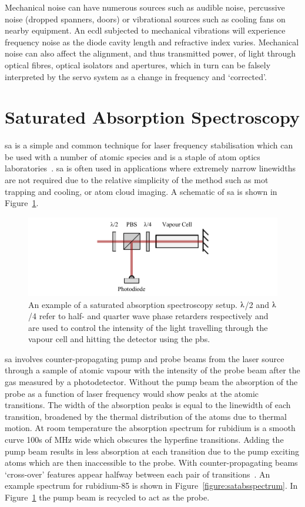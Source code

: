 Mechanical noise can have numerous sources such as audible noise, percussive noise (dropped spanners, doors) or vibrational sources such as cooling fans on nearby equipment.
An \gls{ecdl} subjected to mechanical vibrations will experience frequency noise as the diode cavity length and refractive index varies.
Mechanical noise can also affect the alignment, and thus transmitted power, of light through optical fibres, optical isolators and apertures, which in turn can be falsely interpreted by the servo system as a change in frequency and `corrected'.

\section{Saturated Absorption Spectroscopy}
\Gls{sa} is a simple and common technique for laser frequency stabilisation which can be used with a number of atomic species and is a staple of atom optics laboratories~\cite{demtroder_laser_2003}.
\Gls{sa} is often used in applications where extremely narrow linewidths are not required due to the relative simplicity of the method such as \gls{mot} trapping and cooling, or atom cloud imaging.
A schematic of \gls{sa} is shown in Figure~\ref{figure:satabs}.

\begin{figure}
\center
\includegraphics{part1/Figs/SatAbs.pdf}
\caption[Saturated absorption spectroscopy setup.]{An example of a saturated absorption spectroscopy setup. $\lambdaup$/2 and $\lambdaup$/4 refer to half- and quarter wave phase retarders respectively and are used to control the intensity of the light travelling through the vapour cell and hitting the detector using the \gls{pbs}.}
\label{figure:satabs}
\end{figure}

\Gls{sa} involves counter-propagating pump and probe beams from the laser source through a sample of atomic vapour with the intensity of the probe beam after the gas measured by a photodetector.
Without the pump beam the absorption of the probe as a function of laser frequency would show peaks at the atomic transitions.
The width of the absorption peaks is equal to the linewidth of each transition, broadened by the thermal distribution of the atoms due to thermal motion.
At room temperature the absorption spectrum for rubidium is a smooth curve 100s of MHz wide which obscures the hyperfine transitions.
Adding the pump beam results in less absorption at each transition due to the pump exciting atoms which are then inaccessible to the probe. With counter-propagating beams `cross-over' features appear halfway between each pair of transitions~\cite{demtroder_laser_2003}.
An example spectrum for rubidium-85 is shown in Figure~\ref{figure:satabsspectrum}.
In Figure~\ref{figure:satabs} the pump beam is recycled to act as the probe.

